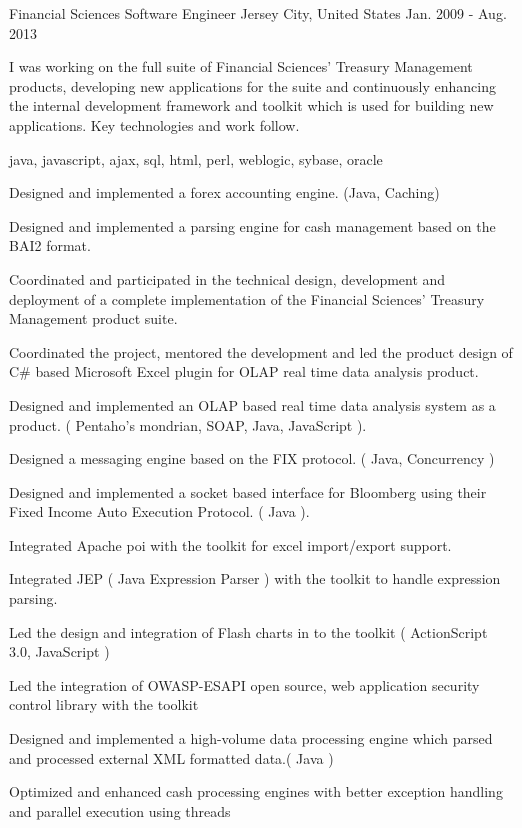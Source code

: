 \cventry
    {Financial Sciences} %
    {Software Engineer} %
    {Jersey City, United States} %
    {Jan. 2009 - Aug. 2013} %
    {
    \begin{cvitems} %
        I was working on the full suite of Financial Sciences' Treasury Management products, developing new applications for the suite and continuously enhancing the
        internal development framework and toolkit which is used for building new applications. Key technologies and work follow.
        \item { java, javascript, ajax, sql, html, perl, weblogic, sybase, oracle }
        \item { Designed and implemented a forex accounting engine. (Java, Caching)}
        \item { Designed and implemented a parsing engine for cash management based on the BAI2 format.}
        \item { Coordinated and participated in the technical design, development and deployment of a complete implementation of the Financial Sciences' Treasury Management product suite.}
        \item { Coordinated the project, mentored the development and led the product design of C\# based Microsoft Excel plugin for OLAP real time data analysis product.}
        \item { Designed and implemented an OLAP based real time data analysis system as a product. ( Pentaho's mondrian, SOAP, Java, JavaScript ).}
        \item { Designed a messaging engine based on the FIX protocol. ( Java, Concurrency )}
        \item { Designed and implemented a socket based interface for Bloomberg using their Fixed Income Auto Execution Protocol. ( Java ).}
        \item { Integrated Apache poi with the toolkit for excel import/export support.}
        \item { Integrated JEP ( Java Expression Parser ) with the toolkit to handle expression parsing.}
        \item { Led the design and integration of Flash charts in to the toolkit ( ActionScript 3.0, JavaScript )}
        \item { Led the integration of OWASP-ESAPI open source, web application security control library with the toolkit}
        \item { Designed and implemented a high-volume data processing engine which parsed and processed external XML formatted data.( Java )}
        \item { Optimized and enhanced cash processing engines with better exception handling and parallel execution using threads }
    \end{cvitems}
    }